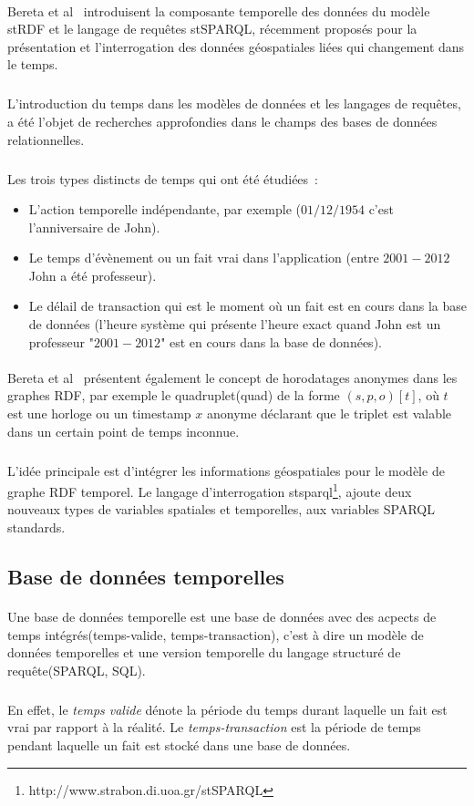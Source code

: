 \documentclass[12pt,a4	]{report}
\begin{document}
\paragraph{}
Bereta et al~\cite{bereta2013} introduisent la composante temporelle des données du modèle stRDF et le langage de requêtes stSPARQL, récemment proposés pour la présentation et l’interrogation des données géospatiales liées qui changement dans le temps.
\subparagraph{}
L’introduction du temps dans les modèles de données et les langages de requêtes, a été l’objet de recherches approfondies dans le champs des bases de données relationnelles.
\subparagraph{}
Les trois types distincts de temps qui ont été étudiées~:
\begin{itemize}
\item L'action temporelle indépendante, par exemple ($01/12/1954$ c’est l’anniversaire de John).
\item Le temps d’évènement ou un fait vrai dans l’application (entre $2001-2012$ John a été professeur).
\item Le délail de transaction qui est le moment où un fait est en cours dans la base de données (l’heure système qui présente l’heure exact quand John est un professeur "$2001-2012$" est en cours dans la base de données).
\end{itemize}
\paragraph{}
Bereta et al~\cite{bereta2013} présentent également le concept de horodatages anonymes dans les graphes RDF, par exemple le quadruplet(quad) de la forme $(s, p, o)[t]$, où $t$ est une horloge ou un timestamp $x$ anonyme déclarant que le triplet est valable dans un certain point de temps inconnue.
\subparagraph{}
L’idée principale est d’intégrer les informations géospatiales pour le modèle de graphe RDF temporel. Le langage d’interrogation \gls{stsparql}\footnote{http://www.strabon.di.uoa.gr/stSPARQL}, ajoute deux nouveaux types de variables spatiales et temporelles, aux variables SPARQL standards.
\subsection*{Base de données temporelles}
\paragraph{}
Une base de données temporelle est une base de données avec des acpects de temps intégrés(temps-valide, temps-transaction), c'est à dire un modèle de données temporelles et une version temporelle du langage structuré de requête(SPARQL, SQL).
\subparagraph{}
En effet, le \textit{temps valide} dénote la période du temps durant laquelle un fait est vrai par rapport à la réalité.
Le \textit{temps-transaction} est la période de temps pendant laquelle un fait est stocké dans une base de données.
\end{document}
